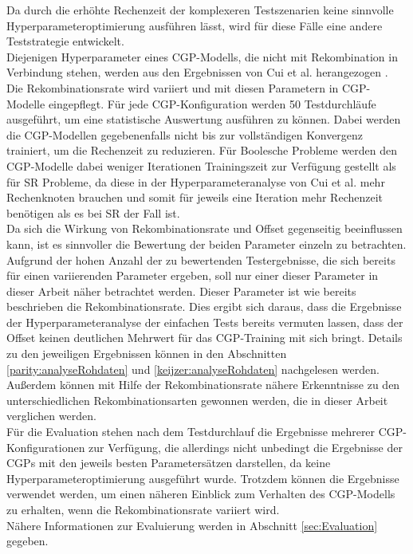 Da durch die erhöhte Rechenzeit der komplexeren Testszenarien keine sinnvolle Hyperparameteroptimierung ausführen lässt, wird für diese Fälle eine andere Teststrategie entwickelt.\\
Diejenigen Hyperparameter eines CGP-Modells, die nicht mit Rekombination in Verbindung stehen, werden aus den Ergebnissen von Cui et al. herangezogen \cite{cui_results}.
Die Rekombinationsrate wird variiert und mit diesen Parametern in CGP-Modelle eingepflegt.
Für jede CGP-Konfiguration werden 50 Testdurchläufe ausgeführt, um eine statistische Auswertung ausführen zu können.
Dabei werden die CGP-Modellen gegebenenfalls nicht bis zur vollständigen Konvergenz trainiert, um die Rechenzeit zu reduzieren. 
Für Boolesche Probleme werden den CGP-Modelle dabei weniger Iterationen Trainingszeit zur Verfügung gestellt als für SR Probleme, da diese in der Hyperparameteranalyse von Cui et al. mehr Rechenknoten brauchen und somit für jeweils eine Iteration mehr Rechenzeit benötigen als es bei SR der Fall ist. \cite{cui_results}\\
Da sich die Wirkung von Rekombinationsrate und Offset gegenseitig beeinflussen kann, ist es sinnvoller die Bewertung der beiden Parameter einzeln zu betrachten.
Aufgrund der hohen Anzahl der zu bewertenden Testergebnisse, die sich bereits für einen variierenden Parameter ergeben, soll nur einer dieser Parameter in dieser Arbeit näher betrachtet werden.
Dieser Parameter ist wie bereits beschrieben die Rekombinationsrate.
Dies ergibt sich daraus, dass die Ergebnisse der Hyperparameteranalyse der einfachen Tests bereits vermuten lassen, dass der Offset keinen deutlichen Mehrwert für das CGP-Training mit sich bringt.
Details zu den jeweiligen Ergebnissen können in den Abschnitten \ref{parity:analyseRohdaten} und \ref{keijzer:analyseRohdaten} nachgelesen werden.
Außerdem können mit Hilfe der Rekombinationsrate nähere Erkenntnisse zu den unterschiedlichen Rekombinationsarten gewonnen werden, die in dieser Arbeit verglichen werden.\\
Für die Evaluation stehen nach dem Testdurchlauf die Ergebnisse mehrerer CGP-Kon\-fi\-gu\-ra\-tio\-nen zur Verfügung, die allerdings nicht unbedingt die Ergebnisse der CGPs mit den jeweils besten Parametersätzen darstellen, da keine Hyperparameteroptimierung ausgeführt wurde.
Trotzdem können die Ergebnisse verwendet werden, um einen näheren Einblick zum Verhalten des CGP-Modells zu erhalten, wenn die Rekombinationsrate variiert wird.\\
Nähere Informationen zur Evaluierung werden in Abschnitt \ref{sec:Evaluation} gegeben.


